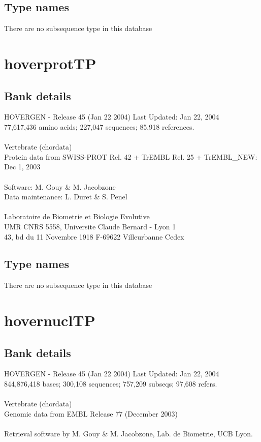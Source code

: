 \documentclass{article}
\begin{document}
\begin{Schunk}
\subsection{Type names}
There are no subsequence type in this database
\section{ hoverprotTP }
\subsection{Bank details}
HOVERGEN - Release 45 (Jan 22 2004) Last Updated: Jan 22, 2004\\
77,617,436 amino acids; 227,047 sequences; 85,918 references.\\
\\
Vertebrate (chordata)\\
Protein data from SWISS-PROT Rel. 42  + TrEMBL Rel. 25 + TrEMBL\_NEW: Dec 1, 2003\\
\\
Software: M. Gouy \& M. Jacobzone\\
Data maintenance: L. Duret \& S. Penel\\
\\
Laboratoire de Biometrie et Biologie Evolutive\\
UMR CNRS 5558, Universite Claude Bernard - Lyon 1\\
43, bd du 11 Novembre 1918 F-69622 Villeurbanne Cedex\\


\subsection{Type names}
There are no subsequence type in this database
\section{ hovernuclTP }
\subsection{Bank details}
HOVERGEN - Release 45 (Jan 22 2004) Last Updated: Jan 22, 2004\\
844,876,418 bases; 300,108 sequences; 757,209 subseqs; 97,608 refers.\\
\\
Vertebrate (chordata)\\
Genomic data from EMBL Release 77  (December 2003)\\
\\
Retrieval software by M. Gouy \& M. Jacobzone, Lab. de Biometrie, UCB Lyon.


\end{Schunk}
\end{document}
